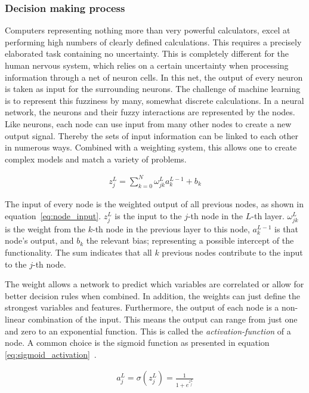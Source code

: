 \subsubsection{Decision making process}

Computers representing nothing more than very powerful calculators, excel at performing high numbers of clearly defined calculations. This requires a precisely elaborated task containing no uncertainty.
This is completely different for the human nervous system, which relies on a certain uncertainty when processing information through a net of neuron cells. In this net, the output of every neuron is taken as input for the surrounding neurons. The challenge of machine learning is to represent this fuzziness by many, somewhat discrete calculations. In a neural network, the neurons and their fuzzy interactions are represented by the nodes. Like neurons, each node can use input from many other nodes to create a new output signal. Thereby the sets of input information can be linked to each other in numerous ways. Combined with a weighting system, this allows one to create complex models and match a variety of problems.

\begin{align}
    z_j^L = \sum_{k=0}^{N} \omega_{jk}^L a_k^{L-1} + b_k
    \label{eq:node_input}
\end{align}

The input of every node is the weighted output of all previous nodes, as shown in equation~\eqref{eq:node_input}. $z_j^L$ is the input to the $j$-th node in the $L$-th layer. $\omega_{jk}^L$ is the weight from the $k$-th node in the previous layer to this node, $a_k^{L-1}$ is that node's output, and $b_k$ the relevant bias; representing a possible intercept of the functionality. The sum indicates that all $k$ previous nodes contribute to the input to the $j$-th node.


The weight allows a network to predict which variables are correlated or allow for better decision rules when combined. In addition, the weights can just define the strongest variables and features. Furthermore, the output of each node is a non-linear combination of the input. This means the output can range from just one and zero to an exponential function. This is called the \emph{activation-function} of a node. A common choice is the sigmoid function as presented in equation \eqref{eq:sigmoid_activation}~\cite{chollet2015keras}.

\begin{align}
    a_j^L = \sigma ( z_j^L ) = \frac{1}{1 + e^{z_j^L}}
    \label{eq:sigmoid_activation}
\end{align}


